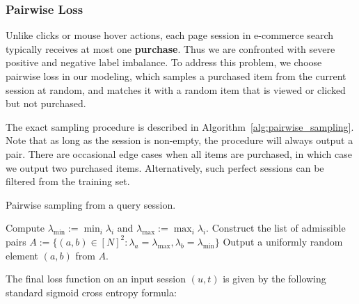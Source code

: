 \subsubsection{Pairwise Loss} \label{subsec:rnn:pairwise}
Unlike clicks or mouse hover actions, each page session in e-commerce search typically receives at most one \textbf{purchase}. Thus we are confronted with severe positive and negative label imbalance. To address this problem, we choose pairwise loss in our modeling, which samples a purchased item from the current session at random, and matches it with a random item that is viewed or clicked but not purchased. 

The exact sampling procedure is described in Algorithm~\ref{alg:pairwise_sampling}. Note that as long as the session is non-empty, the procedure will always output a pair. There are occasional edge cases when all items are purchased, in which case we output two purchased items. Alternatively, such perfect sessions can be filtered from the training set.

\begin{algorithm}[t]
\caption{Pairwise sampling from a query session.}
\label{alg:pairwise_sampling}
\begin{algorithmic}[1]
\STATE Compute $\lambda_{\min} := \min_i \lambda_i$ and $\lambda_{\max} := \max_i \lambda_i$.
\STATE Construct the list of admissible pairs $A := \{(a, b) \in [N]^2: \lambda_a = \lambda_{\max}, \lambda_b = \lambda_{\min}\}$ 
\STATE Output a uniformly random element $(a, b)$ from $A$.
\end{algorithmic}
\end{algorithm}
The final loss function on an input session $(u, t)$ is given by the following standard sigmoid cross entropy formula:

